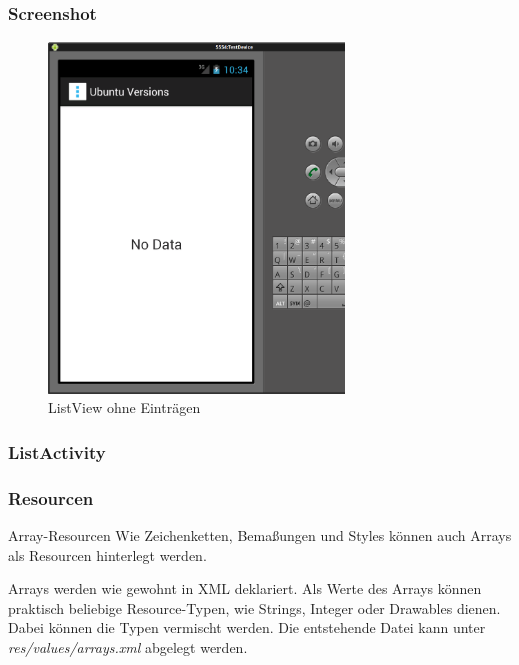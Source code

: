 \begin{frame}
   \frametitle{Screenshot}
   \begin{figure}[h!]
     \centering
     \includegraphics[width=0.7\textwidth]{pictures/hello_list_empty.ps}
     \caption{
        ListView ohne Einträgen
     }
     \label{fig:hello_list_empty}
   \end{figure}
\end{frame}

\begin{frame}
   \frametitle{ListActivity}
   
\end{frame}

\begin{frame}
   \frametitle{Resourcen}

   \begin{alertblock}{Array-Resourcen}
      Wie Zeichenketten, Bemaßungen und Styles können auch Arrays als Resourcen 
      hinterlegt werden.

      \vspace{3mm}

      Arrays werden wie gewohnt in XML deklariert. Als Werte des Arrays können 
      praktisch beliebige Resource-Typen, wie Strings, Integer oder Drawables dienen. 
      Dabei können die Typen vermischt werden. Die entstehende Datei kann unter 
      \emph{res/values/arrays.xml} abgelegt werden.

      \vspace{3mm}

       
   \end{alertblock}
\end{frame}

